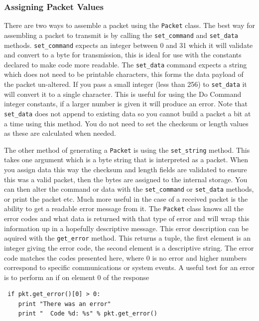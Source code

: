 \documentclass[a4paper,10pt]{book}
\begin{document}
\subsubsection{Assigning Packet Values}
There are two ways to assemble a packet using the \texttt{Packet} class.  The best way for assembling a packet to transmit is by calling the \texttt{set\_command} and \texttt{set\_data} methods.  \texttt{set\_command} expects an integer between 0 and 31 which it will validate and convert to a byte for transmission, this is ideal for use with the constants declared to make code more readable.  The \texttt{set\_data} command expects a string which does not need to be printable characters, this forms the data payload of the packet un-altered.  If you pass a small integer (less than 256) to \texttt{set\_data} it will convert it to a single character.  This is useful for using the Do Command integer constants, if a larger number is given it will produce an error.  Note that \texttt{set\_data} does not append to existing data so you cannot build a packet a bit at a time using this method.  You do not need to set the checksum or length values as these are calculated when needed.

The other method of generating a \texttt{Packet} is using the \texttt{set\_string} method.  This takes one argument which is a byte string that is interpreted as a packet.  When you assign data this way the checksum and length fields are validated to ensure this was a valid packet, then the bytes are assigned to the internal storage.  You can then alter the command or data with the \texttt{set\_command} or \texttt{set\_data} methods, or print the packet etc.  Much more useful in the case of a received packet is the ability to get a readable error message from it.  The \texttt{Packet} class knows all the error codes and what data is returned with that type of error and will wrap this information up in a hopefully descriptive message.  This error description can be aquired with the \texttt{get\_error} method.  This returns a tuple, the first element is an integer giving the error code, the second element is a descriptive string.  The error code matches the codes presented here, where 0 is no error and higher numbers correspond to specific communications or system events.  A useful test for an error is to perform an if on element 0 of the response
\begin{verbatim}
 if pkt.get_error()[0] > 0:
    print "There was an error"
    print "  Code %d: %s" % pkt.get_error()
\end{verbatim}
\end{document}
